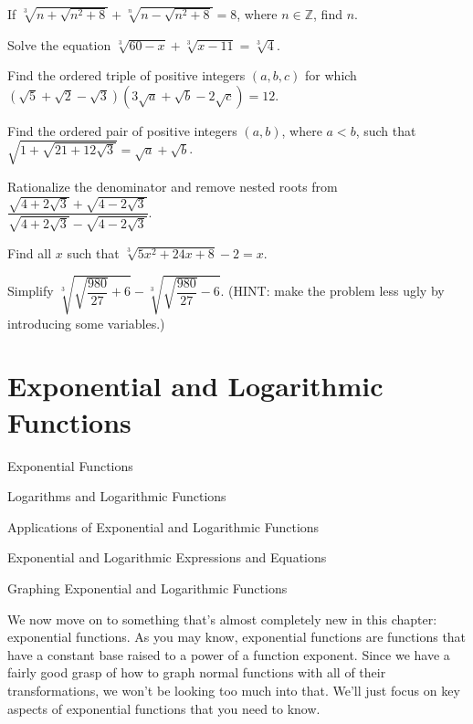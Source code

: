 \documentclass[lang=en,11pt]{elegantbook}
\begin{document}
\begin{challengeset}
\item If $\sqrt[3]{n+\sqrt{n^2+8}}+\sqrt[n]{n-\sqrt{n^2+8}}=8$, where $n\in\mathbb{Z}$, find $n$. \vspace{3mm}
\item Solve the equation $\sqrt[3]{60-x}+\sqrt[3]{x-11}=\sqrt[3]{4}$. \vspace{3mm}
\item Find the ordered triple of positive integers $(a,b,c)$ for which $\left(\sqrt{5}+\sqrt{2}-\sqrt{3}\right)\left(3\sqrt{a}+\sqrt{b}-2\sqrt{c}\right)=12.$ \vspace{3mm}
\item Find the ordered pair of positive integers $(a,b)$, where $a<b$, such that $\sqrt{1+\sqrt{21+12\sqrt{3}}}=\sqrt{a}+\sqrt{b}$. \vspace{3mm}
\item Rationalize the denominator and remove nested roots from $\dfrac{\sqrt{4+2\sqrt{3}}+\sqrt{4-2\sqrt{3}}}{\sqrt{4+2\sqrt{3}}-\sqrt{4-2\sqrt{3}}}$. \vspace{3mm}
\item Find all $x$ such that $\sqrt[3]{5x^2+24x+8}-2=x$. \vspace{3mm}
\item Simplify $\sqrt[3]{\sqrt{\dfrac{980}{27}}+6}-\sqrt[3]{\sqrt{\dfrac{980}{27}}-6}$. (HINT: make the problem less ugly by introducing some variables.) \vspace{3mm}
\end{challengeset}
\chapter{Exponential and Logarithmic Functions}
\begin{introduction}[Contents]
\item Exponential Functions
\item Logarithms and Logarithmic Functions
\item Applications of Exponential and Logarithmic Functions
\item Exponential and Logarithmic Expressions and Equations
\item Graphing Exponential and Logarithmic Functions
\end{introduction}
\noindent We now move on to something that's almost completely new in this chapter: exponential functions.  As you may know, exponential functions are functions that have a constant base raised to a power of a function exponent.  Since we have a fairly good grasp of how to graph normal functions with all of their transformations, we won’t be looking too much into that.  We’ll just focus on key aspects of exponential functions that you need to know.  
\end{document}
